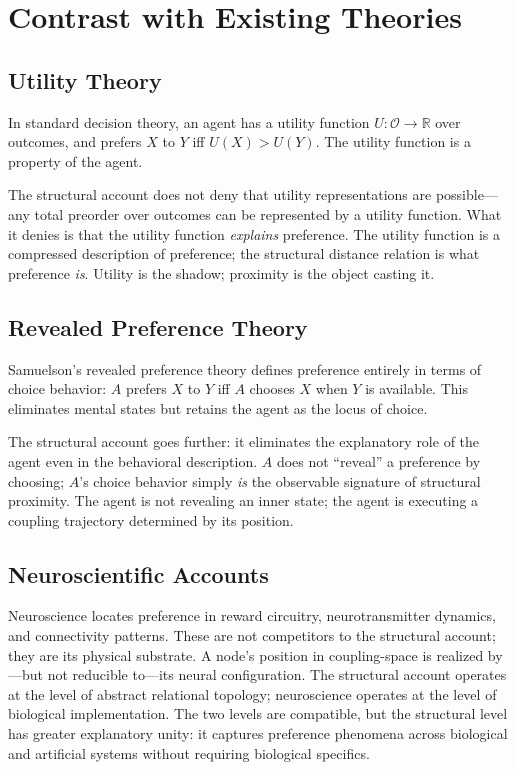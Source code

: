 \documentclass[12pt,a4paper]{article}
\begin{document}
\section{Contrast with Existing Theories}

\subsection{Utility Theory}

In standard decision theory, an agent has a utility function $U: \mathcal{O} \to \mathbb{R}$ over outcomes, and prefers $X$ to $Y$ iff $U(X) > U(Y)$. The utility function is a property of the agent.

The structural account does not deny that utility representations are possible---any total preorder over outcomes can be represented by a utility function. What it denies is that the utility function \emph{explains} preference. The utility function is a compressed description of preference; the structural distance relation is what preference \emph{is}. Utility is the shadow; proximity is the object casting it.

\subsection{Revealed Preference Theory}

Samuelson's revealed preference theory \citep{samuelson1938} defines preference entirely in terms of choice behavior: $A$ prefers $X$ to $Y$ iff $A$ chooses $X$ when $Y$ is available. This eliminates mental states but retains the agent as the locus of choice.

The structural account goes further: it eliminates the explanatory role of the agent even in the behavioral description. $A$ does not ``reveal'' a preference by choosing; $A$'s choice behavior simply \emph{is} the observable signature of structural proximity. The agent is not revealing an inner state; the agent is executing a coupling trajectory determined by its position.

\subsection{Neuroscientific Accounts}

Neuroscience locates preference in reward circuitry, neurotransmitter dynamics, and connectivity patterns. These are not competitors to the structural account; they are its physical substrate. A node's position in coupling-space is realized by---but not reducible to---its neural configuration. The structural account operates at the level of abstract relational topology; neuroscience operates at the level of biological implementation. The two levels are compatible, but the structural level has greater explanatory unity: it captures preference phenomena across biological and artificial systems without requiring biological specifics.
\end{document}
